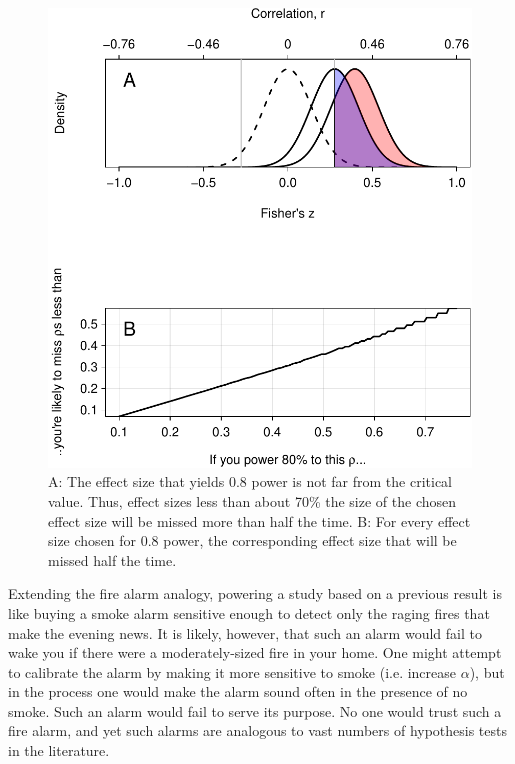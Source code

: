 \documentclass[doc,a4paper,floatsintext,draftfirst]{apa6}
\makeatletter
\def\maxwidth{ %
  \ifdim\Gin@nat@width>\linewidth
    \linewidth
  \else
    \Gin@nat@width
  \fi
}
\makeatother
\begin{document}
\begin{figure}
\includegraphics[width=\maxwidth]{figure/powfail-1} \caption{A: The effect size that yields 0.8 power is not far from the critical value. Thus, effect sizes less than about 70\% the size of the chosen effect size will be missed more than half the time. B: For every effect size chosen for 0.8 power, the corresponding effect size that will be missed half the time.}\label{fig:powfail1}
\end{figure}

Extending the fire alarm analogy, powering a study based on a previous result is like buying a smoke alarm sensitive enough to detect only the raging fires that make the evening news. It is likely, however, that such an alarm would fail to wake you if there were a moderately-sized fire in your home. One might attempt to calibrate the alarm by making it more sensitive to smoke (i.e. increase $\alpha$), but in the process one would make the alarm sound often in the presence of no smoke. Such an alarm would fail to serve its purpose. No one would trust such a fire alarm, and yet such alarms are analogous to vast numbers of hypothesis tests in the literature.
\end{document}
